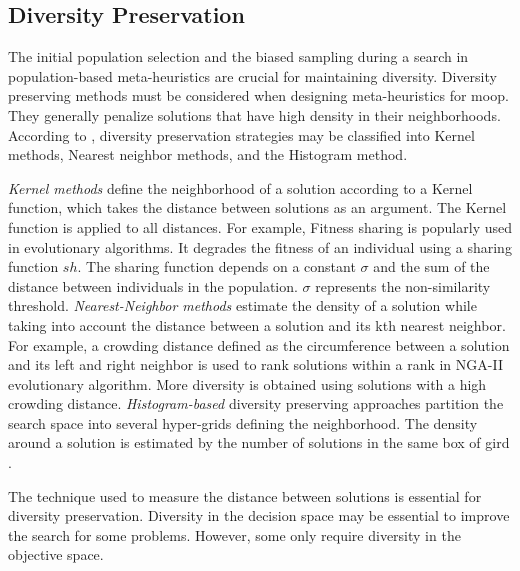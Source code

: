 \subsection{Diversity Preservation}
The initial population selection and the biased sampling during a search in population-based meta-heuristics are crucial for maintaining diversity. Diversity preserving methods must be considered when designing meta-heuristics for \gls{moop}. They generally penalize solutions that have high density in their neighborhoods. According to \parencite{Emmerich2018AMethods}, diversity preservation strategies may be classified into Kernel methods, Nearest neighbor methods, and the Histogram method.

\textit{Kernel methods} define the neighborhood of a solution according to a Kernel function, which takes the distance between solutions as an argument. The Kernel function is applied to all distances. For example, Fitness sharing is popularly used in evolutionary algorithms. It degrades the fitness of an individual using a sharing function $sh$. The sharing function depends on a constant $\sigma$ and the sum of the distance between individuals in the population.  $\sigma$ represents the non-similarity threshold. \textit{Nearest-Neighbor methods} estimate the density of a solution while taking into account the distance between a solution and its kth nearest neighbor. For example, a crowding distance defined as the circumference between a solution and its left and right neighbor is used to rank solutions within a rank in NGA-II evolutionary algorithm. More diversity is obtained using solutions with a high crowding distance. \textit{Histogram-based} diversity preserving approaches partition the search space into several hyper-grids defining the neighborhood. The density around a solution is estimated by the number of solutions in the same box of gird \parencite{Talbi2009Metaheuristics:Implementation}.

The technique used to measure the distance between solutions is essential for diversity preservation. Diversity in the decision space may be essential to improve the search for some problems. However, some only require diversity in the objective space.







 